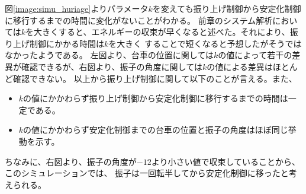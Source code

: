 	図\ref{image:simu_huriage}よりパラメータ$k$を変えても振り上げ制御から安定化制御に移行するまでの時間に変化がないことがわかる。
	前章のシステム解析においては$k$を大きくすると、エネルギーの収束が早くなると述べた。それにより、振り上げ制御にかかる時間は$k$を大きく
	することで短くなると予想したがそうではなかったようである。
	左図より、台車の位置に関しては$k$の値によって若干の差異が確認できるが、右図より、振子の角度に関しては$k$の値による差異はほとんど確認できない。
	以上から振り上げ制御に関して以下のことが言える。また、
	\begin{itemize}
	  \item $k$の値にかかわらず振り上げ制御から安定化制御に移行するまでの時間は一定である。
	  \item $k$の値にかかわらず安定化制御までの台車の位置と振子の角度はほぼ同じ挙動を示す。
	\end{itemize}
	ちなみに、右図より、振子の角度が$-12$より小さい値で収束していることから、このシミュレーションでは、
	振子は一回転半してから安定化制御に移ったと考えられる。
	
	
	
